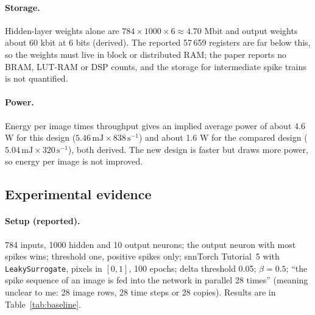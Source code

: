 \paragraph{Storage.} Hidden-layer weights alone are $784\times1000\times6\approx4.70$ Mbit and output weights about 60 kbit at 6 bits (derived). The reported 57\,659 registers are far below this, so the weights must live in block or distributed RAM; the paper reports no BRAM, LUT-RAM or DSP counts, and the storage for intermediate spike trains is not quantified.

\paragraph{Power.} Energy per image times throughput gives an implied average power of about 4.6 W for this design ($5.46\,\mathrm{mJ}\times838\,\mathrm{s^{-1}}$) and about 1.6 W for the compared design ($5.04\,\mathrm{mJ}\times320\,\mathrm{s^{-1}}$), both derived. The new design is faster but draws more power, so energy per image is not improved.

\subsection{Experimental evidence}
\paragraph{Setup (reported).} 784 inputs, 1000 hidden and 10 output neurons; the output neuron with most spikes wins; threshold one, positive spikes only; snnTorch Tutorial~5 with \texttt{LeakySurrogate}, pixels in $[0,1]$, 100 epochs; delta threshold 0.05; $\beta=0.5$; ``the spike sequence of an image is fed into the network in parallel 28 times'' (meaning unclear to me: 28 image rows, 28 time steps or 28 copies). Results are in Table~\ref{tab:baseline}.

